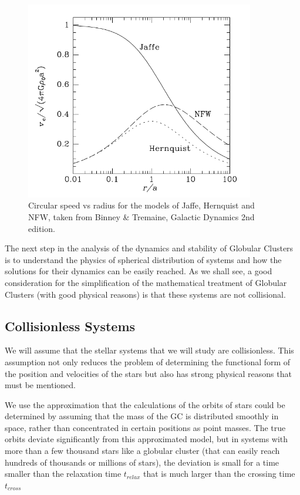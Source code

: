 \begin{figure}[H]
\centering
\includegraphics[width=10cm]{images/circular_velocity_vs_radius.png}
\caption[Circular speed vs radius for the Jaffe, Hernquist, and NFW models]{Circular speed vs radius for the models of Jaffe, Hernquist and NFW, taken from Binney \& Tremaine, Galactic Dynamics 2nd edition.}
\end{figure}

The next step in the analysis of the dynamics and stability of Globular Clusters is to understand the physics of spherical distribution of systems and how the solutions for their dynamics can be easily reached. As we shall see, a good consideration for the simplification of the mathematical treatment of Globular Clusters (with good physical reasons) is that these systems are not collisional.

\subsection{Collisionless Systems}

We will assume that the stellar systems that we will study are collisionless. This assumption not only reduces the problem of determining the functional form of the position and velocities of the stars but also has strong physical reasons that must be mentioned.

We use the approximation that the calculations of the orbits of stars could be determined by assuming that the mass of the GC is distributed smoothly in space, rather than concentrated in certain positions as point masses. The true orbits deviate significantly from this approximated model, but in systems with more than a few thousand stars like a globular cluster (that can easily reach hundreds of thousands or millions of stars), the deviation is small for a time smaller than the relaxation time $t_{relax}$ that is much larger than the crossing time $t_{cross}$

